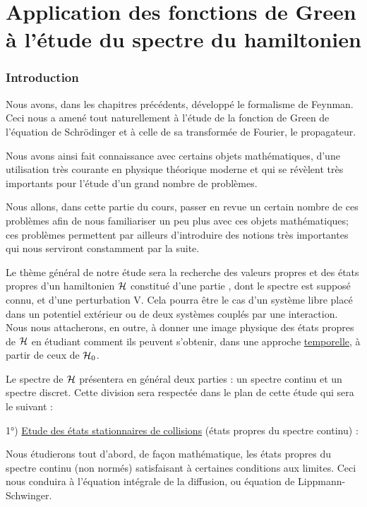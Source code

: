 \part{Application des fonctions de Green à l'étude du spectre du hamiltonien}%
%
\section{Introduction}%


Nous avons, dans les chapitres précédents, développé le formalisme de Feynman.
Ceci nous a amené tout naturellement à l'étude de
la fonction de Green de l'équation de Schrödinger et à celle de sa transformée
de Fourier, le propagateur.

Nous avons ainsi fait connaissance avec certains objets mathématiques, d'une
utilisation très courante en physique théorique moderne et qui se révèlent très
importants pour l'étude d'un grand nombre
de problèmes.

Nous allons, dans cette partie du cours, passer en revue un
certain nombre de ces problèmes afin de nous familiariser un peu plus
avec ces objets mathématiques; ces problèmes permettent par ailleurs
d'introduire des notions très importantes qui nous serviront constamment
par la suite.

Le thème général de notre étude sera la recherche des valeurs
propres et des états propres d'un hamiltonien $\mathcal{H}$ constitué d'une partie
, dont le spectre est supposé connu, et d'une perturbation V. Cela pourra être
le cas d'un système libre placé dans un potentiel extérieur ou de 
deux systèmes couplés par une interaction. Nous nous attacherons, en outre,
à donner une image physique des états propres de $\mathcal{H}$ en étudiant comment
ils peuvent s'obtenir, dans une approche \ul{temporelle}, à partir de ceux de
$\mathcal{H}_0$.

Le spectre de $\mathcal{H}$ présentera en général deux parties : un spectre continu et un
spectre discret. Cette division sera respectée dans le
plan de cette étude qui sera le suivant :

1°) \ul{Etude des états stationnaires de collisions} (états propres
du spectre continu) :

Nous étudierons tout d'abord, de façon mathématique, les états
propres du spectre continu (non normés) satisfaisant à certaines conditions
aux limites. Ceci nous conduira à l'équation intégrale de la diffusion, ou
équation de Lippmann-Schwinger.

